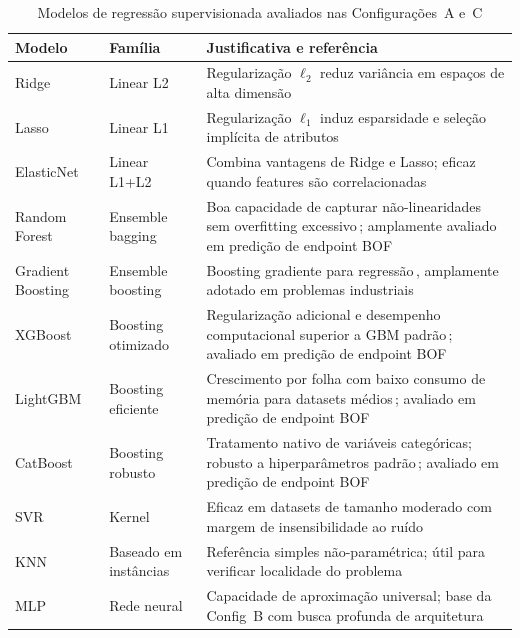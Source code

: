 \begin{table}[H]
\centering
\caption{Modelos de regressão supervisionada avaliados nas Configurações~A e~C}
\label{tbl:modelos-ml}
\small
\begin{tabular}{|p{3.0cm}|p{2.8cm}|p{8.2cm}|}
\hline
\textbf{Modelo} & \textbf{Família} & \textbf{Justificativa e referência} \\ \hline
Ridge & Linear L2 & Regularização $\ell_2$ reduz variância em espaços de alta dimensão\,\cite{hoerl1970ridge} \\ \hline
Lasso & Linear L1 & Regularização $\ell_1$ induz esparsidade e seleção implícita de atributos\,\cite{tibshirani1996regression} \\ \hline
ElasticNet & Linear L1+L2 & Combina vantagens de Ridge e Lasso; eficaz quando features são correlacionadas\,\cite{zou2005regularization} \\ \hline
Random Forest & Ensemble bagging & Boa capacidade de capturar não-linearidades sem overfitting excessivo\,\cite{breiman2001randomforests}; amplamente avaliado em predição de endpoint BOF\,\cite{zhou2024bof,chattopadhyay2022hybrid} \\ \hline
Gradient Boosting & Ensemble boosting & Boosting gradiente para regressão\,\cite{friedman2001greedy}, amplamente adotado em problemas industriais\,\cite{zhou2024bof} \\ \hline
XGBoost & Boosting otimizado & Regularização adicional e desempenho computacional superior a GBM padrão\,\cite{chen2016xgboost}; avaliado em predição de endpoint BOF\,\cite{zhou2024bof} \\ \hline
LightGBM & Boosting eficiente & Crescimento por folha com baixo consumo de memória para datasets médios\,\cite{ke2017lightgbm}; avaliado em predição de endpoint BOF\,\cite{zhou2024bof} \\ \hline
CatBoost & Boosting robusto & Tratamento nativo de variáveis categóricas; robusto a hiperparâmetros padrão\,\cite{prokhorenkova2018catboost}; avaliado em predição de endpoint BOF\,\cite{zhou2024bof} \\ \hline
SVR & Kernel & Eficaz em datasets de tamanho moderado com margem de insensibilidade ao ruído\,\cite{widodo2007svm} \\ \hline
KNN & Baseado em instâncias & Referência simples não-paramétrica; útil para verificar localidade do problema\,\cite{bishop2006prml} \\ \hline
MLP & Rede neural & Capacidade de aproximação universal; base da Config~B com busca profunda de arquitetura\,\cite{goodfellow2016deep} \\ \hline
\end{tabular}
\end{table}

